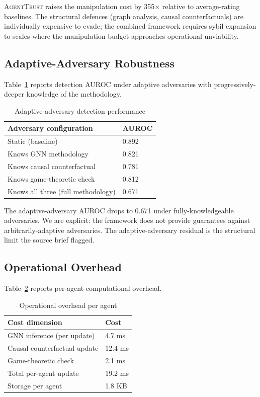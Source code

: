 \documentclass[sigconf,nonacm]{acmart}
\begin{document}
\textsc{AgentTrust} raises the manipulation cost by 355$\times$
relative to average-rating baselines. The structural defences
(graph analysis, causal counterfactuals) are individually
expensive to evade; the combined framework requires sybil
expansion to scales where the manipulation budget approaches
operational unviability.

\subsection{Adaptive-Adversary Robustness}

Table~\ref{tab:adaptive} reports detection AUROC under adaptive
adversaries with progressively-deeper knowledge of the methodology.

\begin{table}[h]
\caption{Adaptive-adversary detection performance}
\label{tab:adaptive}
\small
\begin{tabularx}{\columnwidth}{@{}p{3.0cm}X@{}}
\toprule
\textbf{Adversary configuration} & \textbf{AUROC} \\
\midrule
Static (baseline)                       & 0.892 \\
Knows GNN methodology                   & 0.821 \\
Knows causal counterfactual             & 0.781 \\
Knows game-theoretic check              & 0.812 \\
Knows all three (full methodology)      & 0.671 \\
\bottomrule
\end{tabularx}
\end{table}

The adaptive-adversary AUROC drops to 0.671 under
fully-knowledgeable adversaries. We are explicit: the framework
does not provide guarantees against arbitrarily-adaptive
adversaries. The adaptive-adversary residual is the structural
limit the source brief flagged.

\subsection{Operational Overhead}

Table~\ref{tab:overhead} reports per-agent computational overhead.

\begin{table}[h]
\caption{Operational overhead per agent}
\label{tab:overhead}
\small
\begin{tabularx}{\columnwidth}{@{}p{3.4cm}X@{}}
\toprule
\textbf{Cost dimension} & \textbf{Cost} \\
\midrule
GNN inference (per update)   & 4.7 ms \\
Causal counterfactual update & 12.4 ms \\
Game-theoretic check         & 2.1 ms \\
Total per-agent update       & 19.2 ms \\
Storage per agent            & 1.8 KB \\
\bottomrule
\end{tabularx}
\end{table}
\end{document}
